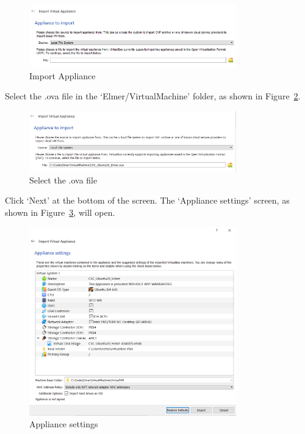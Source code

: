 \begin{figure}[H]
\begin{center}
\includegraphics[width=0.8\textwidth]{virt-2}
\caption{Import Appliance}\label{fg:virt-2}
\end{center}
\end{figure}

Select the .ova file in the `Elmer/VirtualMachine' folder, as shown in Figure~\ref{fg:virt-3}. 

\begin{figure}[H]
\begin{center}
\includegraphics[width=0.8\textwidth]{virt-3}
\caption{Select the .ova file}\label{fg:virt-3}
\end{center}
\end{figure}

Click `Next' at the bottom of the screen.  The `Appliance settings' screen, as shown in Figure~\ref{fg:virt-4}, will open.  

\begin{figure}[H]
\begin{center}
\includegraphics[width=0.8\textwidth]{virt-4}
\caption{Appliance settings}\label{fg:virt-4}
\end{center}
\end{figure}

